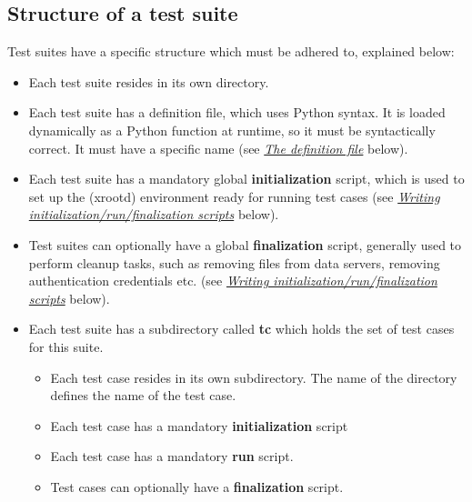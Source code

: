 \documentclass[a4paper,11pt,openany]{sphinxmanual}
\begin{document}
\subsection{Structure of a test suite}
\label{testsuites:structure-of-a-test-suite}
Test suites have a specific structure which must be adhered to,
explained below:
\begin{itemize}
\item {} 
Each test suite resides in its own directory.

\item {} 
Each test suite has a definition file, which uses Python syntax. It is loaded
dynamically as a Python function at runtime, so it must be syntactically
correct. It must have a specific name (see {\hyperref[testsuites:def-file]{\emph{The definition file}}} below).

\item {} 
Each test suite has a mandatory global \textbf{initialization} script, which is
used to set up the (xrootd) environment ready for running test cases (see
{\hyperref[testsuites:scripts]{\emph{Writing initialization/run/finalization scripts}}} below).

\item {} 
Test suites can optionally have a global \textbf{finalization} script, generally
used to perform cleanup tasks, such as removing files from data servers,
removing authentication credentials etc. (see {\hyperref[testsuites:scripts]{\emph{Writing initialization/run/finalization scripts}}} below).

\item {} 
Each test suite has a subdirectory called \textbf{tc} which holds the set of
test cases for this suite.
\begin{itemize}
\item {} 
Each test case resides in its own subdirectory. The name of the directory
defines the name of the test case.

\item {} 
Each test case has a mandatory \textbf{initialization} script

\item {} 
Each test case has a mandatory \textbf{run} script.

\item {} 
Test cases can optionally have a \textbf{finalization} script.

\end{itemize}

\end{itemize}
\end{document}
